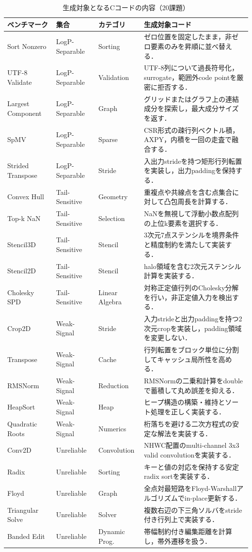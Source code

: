 \documentclass[submit,techrep,noauthor]{ipsj}
\begin{document}
\begin{table}[t]
\caption{生成対象となるCコードの内容（20課題）}
\label{tab:task_details}
\centering
\scriptsize
\setlength{\tabcolsep}{3pt}
\begin{tabular}{@{}lllp{}@{}}
\hline
ベンチマーク & 集合 & カテゴリ & 生成対象コード \\
\hline
Sort Nonzero & LogP-Separable & Sorting & ゼロ位置を固定したまま，非ゼロ要素のみを昇順に並べ替える． \\
UTF-8 Validate & LogP-Separable & Validation & UTF-8列について過長符号化，surrogate，範囲外code pointを厳密に拒否する． \\
Largest Component & LogP-Separable & Graph & グリッドまたはグラフ上の連結成分を探索し，最大成分サイズを返す． \\
SpMV & LogP-Separable & Sparse & CSR形式の疎行列ベクトル積，AXPY，内積を一回の走査で融合する． \\
Strided Transpose & LogP-Separable & Stride & 入出力strideを持つ矩形行列転置を実装し，出力paddingを保持する． \\
\hline
Convex Hull & Tail-Sensitive & Geometry & 重複点や共線点を含む点集合に対して凸包周長を計算する． \\
Top-k NaN & Tail-Sensitive & Selection & NaNを無視して浮動小数点配列の上位k要素を選択する． \\
Stencil3D & Tail-Sensitive & Stencil & 3次元7点ステンシルを境界条件と精度制約を満たして実装する． \\
Stencil2D & Tail-Sensitive & Stencil & halo領域を含む2次元ステンシル計算を実装する． \\
Cholesky SPD & Tail-Sensitive & Linear Algebra & 対称正定値行列のCholesky分解を行い，非正定値入力を検出する． \\
\hline
Crop2D & Weak-Signal & Stride & 入力strideと出力paddingを持つ2次元cropを実装し，padding領域を変更しない． \\
Transpose & Weak-Signal & Cache & 行列転置をブロック単位に分割してキャッシュ局所性を高める． \\
RMSNorm & Weak-Signal & Reduction & RMSNormの二乗和計算をdoubleで蓄積して丸め誤差を抑える． \\
HeapSort & Weak-Signal & Heap & ヒープ構造の構築・維持とソート処理を正しく実装する． \\
Quadratic Roots & Weak-Signal & Numerics & 桁落ちを避ける二次方程式の安定な解法を実装する． \\
\hline
Conv2D & Unreliable & Convolution & NHWC配置のmulti-channel 3x3 valid convolutionを実装する． \\
Radix & Unreliable & Sorting & キーと値の対応を保持する安定radix sortを実装する． \\
Floyd & Unreliable & Graph & 全点対最短路をFloyd-Warshallアルゴリズムでin-place更新する． \\
Triangular Solve & Unreliable & Solver & 複数右辺の下三角ソルバをstride付き行列上で実装する． \\
Banded Edit & Unreliable & Dynamic Prog. & 帯幅制約付き編集距離を計算し，帯外遷移を扱う． \\
\hline
\end{tabular}
\end{table}
\end{document}
